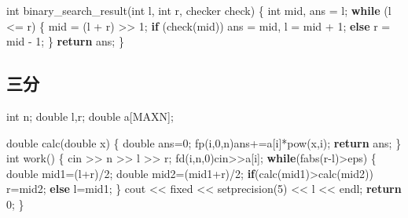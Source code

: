 \documentclass[
]{article}
\newenvironment{Shaded}{}{}
\newcommand{\ControlFlowTok}[1]{\textcolor[rgb]{0.00,0.44,0.13}{\textbf{#1}}}
\newcommand{\DataTypeTok}[1]{\textcolor[rgb]{0.56,0.13,0.00}{#1}}
\newcommand{\DecValTok}[1]{\textcolor[rgb]{0.25,0.63,0.44}{#1}}
\newcommand{\NormalTok}[1]{#1}
\begin{document}
\begin{Shaded}
\begin{Highlighting}[]
\DataTypeTok{int}\NormalTok{ binary\_search\_result(}\DataTypeTok{int}\NormalTok{ l, }\DataTypeTok{int}\NormalTok{ r, checker check)}
\NormalTok{\{}
    \DataTypeTok{int}\NormalTok{ mid, ans = l;}
    \ControlFlowTok{while}\NormalTok{ (l \textless{}= r)}
\NormalTok{    \{}
\NormalTok{        mid = (l + r) \textgreater{}\textgreater{} }\DecValTok{1}\NormalTok{;}
        \ControlFlowTok{if}\NormalTok{ (check(mid))}
\NormalTok{            ans = mid, l = mid + }\DecValTok{1}\NormalTok{;}
        \ControlFlowTok{else}\NormalTok{ r = mid {-} }\DecValTok{1}\NormalTok{;}
\NormalTok{    \}}
    \ControlFlowTok{return}\NormalTok{ ans;}
\NormalTok{\}}
\end{Highlighting}
\end{Shaded}

\hypertarget{ux4e09ux5206}{%
\subsection{三分}\label{ux4e09ux5206}}

\begin{Shaded}
\begin{Highlighting}[]
\DataTypeTok{int}\NormalTok{ n;}
\DataTypeTok{double}\NormalTok{ l,r;}
\DataTypeTok{double}\NormalTok{ a[MAXN];}

\DataTypeTok{double}\NormalTok{ calc(}\DataTypeTok{double}\NormalTok{ x)}
\NormalTok{\{}
    \DataTypeTok{double}\NormalTok{ ans=}\DecValTok{0}\NormalTok{;}
\NormalTok{    fp(i,}\DecValTok{0}\NormalTok{,n)ans+=a[i]*pow(x,i);}
    \ControlFlowTok{return}\NormalTok{ ans;}
\NormalTok{\}}
\DataTypeTok{int}\NormalTok{ work()}
\NormalTok{\{}
\NormalTok{    cin \textgreater{}\textgreater{} n \textgreater{}\textgreater{} l \textgreater{}\textgreater{} r;}
\NormalTok{    fd(i,n,}\DecValTok{0}\NormalTok{)cin\textgreater{}\textgreater{}a[i];}
    \ControlFlowTok{while}\NormalTok{(fabs(r{-}l)\textgreater{}eps)}
\NormalTok{    \{}
        \DataTypeTok{double}\NormalTok{ mid1=(l+r)/}\DecValTok{2}\NormalTok{;}
        \DataTypeTok{double}\NormalTok{ mid2=(mid1+r)/}\DecValTok{2}\NormalTok{;}
        \ControlFlowTok{if}\NormalTok{(calc(mid1)\textgreater{}calc(mid2)) r=mid2;}
        \ControlFlowTok{else}\NormalTok{ l=mid1;}
\NormalTok{    \}}
\NormalTok{    cout \textless{}\textless{} fixed \textless{}\textless{} setprecision(}\DecValTok{5}\NormalTok{) \textless{}\textless{} l \textless{}\textless{} endl;}
    \ControlFlowTok{return} \DecValTok{0}\NormalTok{;}
\NormalTok{\}}
\end{Highlighting}
\end{Shaded}
\end{document}
